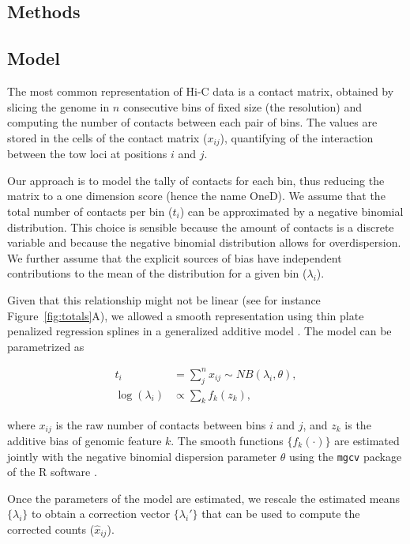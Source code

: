 \documentclass{bioinfo}
\begin{document}
\begin{methods}

\section{Methods}

\subsection{Model}
\label{sec:model}

The most common representation of Hi-C data is a contact matrix, obtained
by slicing the genome in $n$ consecutive bins of fixed size (the
resolution) and computing the number of contacts between each pair of
bins. The values are stored in the cells of the contact matrix ($x_{ij}$),
quantifying of the interaction between the tow loci at positions $i$ and
$j$.

Our approach is to model the tally of contacts for each bin, thus reducing
the matrix to a one dimension score (hence the name OneD). We assume that
the total number of contacts per bin ($t_{i}$) can be approximated by a
negative binomial distribution. This choice is sensible because the amount
of contacts is a discrete variable and because the negative binomial
distribution allows for overdispersion. We further assume that the
explicit sources of bias have independent contributions to the mean of the
distribution for a given bin ($\lambda_i$).

Given that this relationship might not be linear (see for instance
Figure~\ref{fig:totals}A), we allowed a smooth representation
using thin plate penalized regression splines \citep{wood2003thin} in a
generalized additive model \citep{wood2011fast}. The model can be
parametrized as

\begin{align*}
t_i &= \sum_j^n{x_{ij}} \sim  NB(\lambda_i, \theta), \\
\log(\lambda_i) &\propto \sum_{k}{f_k(z_k)},
\end{align*}

\noindent
where $x_{ij}$ is the raw number of contacts between bins $i$ and $j$, and
$z_k$ is the additive bias of genomic feature $k$. The smooth functions
$\{f_k(\cdot)\}$ are estimated jointly with the negative binomial
dispersion parameter $\theta$ using the \texttt{mgcv} package
\citep{wood2011fast} of the R software \citep{coreteam2014r}.

Once the parameters of the model are estimated, we rescale the estimated
means $\{\lambda_i\}$ to obtain a correction vector $\{\lambda_i'\}$ that
can be used to compute the corrected counts ($\hat{x}_{ij}$).


\end{methods}
\end{document}
